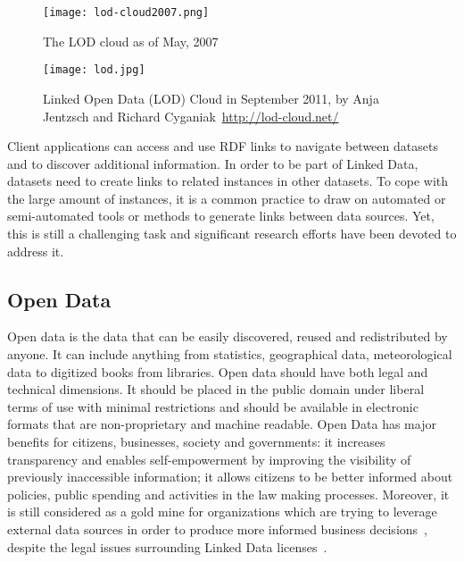 \begin{figure}[ht!]
	\texttt{[image: lod-cloud2007.png]}
	\caption{The LOD cloud as of May, 2007}
	\label{fig:lodcloud2007}
\end{figure}

\begin{figure}[htbp]
	\centering
	\texttt{[image: lod.jpg]}
	\caption{Linked Open Data (LOD) Cloud in September 2011, by Anja Jentzsch and Richard
	Cyganiak~\url{http://lod-cloud.net/}}
	\label{fig:lodcloud2011}
\end{figure}

Client applications can access and use RDF links to navigate between datasets and to discover additional information. In order to be part of Linked Data, datasets need to create links to related instances in other datasets. To cope with the large amount of instances, it is a common practice to draw on automated or semi-automated tools or methods to generate links between data sources. Yet, this is still a challenging task and significant research efforts have been devoted to address it.

\subsection{Open Data}

Open data is the data that can be easily discovered, reused and redistributed by anyone. It can include anything from statistics, geographical data, meteorological data to digitized books from libraries. Open data should have both legal and technical dimensions. It should be placed in the public domain under liberal terms of use with minimal restrictions and should be available in electronic formats that are non-proprietary and machine readable. Open Data has major benefits for citizens, businesses, society and governments: it increases transparency and enables self-empowerment by improving the visibility of previously inaccessible information; it allows citizens to be better informed about policies, public spending and activities in the law making processes. Moreover, it is still considered as a gold mine for organizations which are trying to leverage external data sources in order to produce more informed business decisions~\cite{Boyd:Article:11}, despite the legal issues surrounding Linked Data licenses~\cite{Prateek:Misc:13}.

\begin{figure}[ht!]
\end{figure}